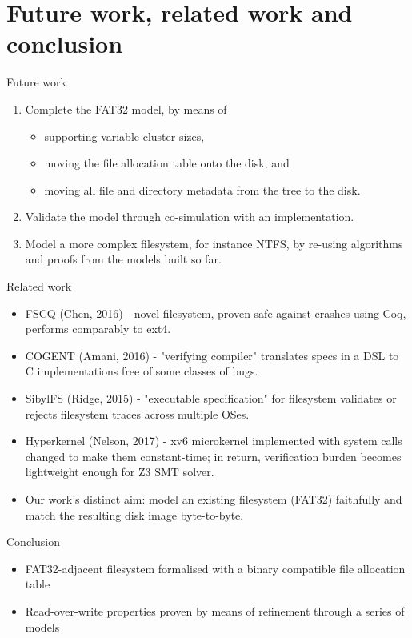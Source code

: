 \documentclass{beamer}
\begin{document}
\section{Future work, related work and conclusion}

\begin{frame}{Future work}
  \begin{enumerate}
  \item Complete the FAT32 model, by means of
    \begin{itemize}
    \item supporting variable cluster sizes,
    \item moving the file allocation table onto the disk, and
    \item moving all file and directory metadata from the tree to the
      disk.
    \end{itemize}
  \item Validate the model through co-simulation with an implementation.
  \item Model a more complex filesystem, for instance NTFS, by
    re-using algorithms and proofs from the models built so far.
  \end{enumerate}
\end{frame}

\begin{frame}{Related work}
  \begin{itemize}
  \item FSCQ (Chen, 2016) - novel filesystem, proven
    safe against crashes using Coq, performs comparably to
    ext4.
  \item COGENT (Amani, 2016) - "verifying compiler" translates specs
    in a DSL to C implementations free of some classes of bugs.
  \item SibylFS (Ridge, 2015) - "executable specification" for
    filesystem validates or rejects filesystem traces across multiple
    OSes.
  \item Hyperkernel (Nelson, 2017) - xv6 microkernel implemented
    with system calls changed to make them constant-time; in return,
    verification burden becomes lightweight enough for Z3 SMT solver.
  \item Our work's distinct aim: model an existing filesystem (FAT32)
    faithfully and match the resulting disk image byte-to-byte.
  \end{itemize}
\end{frame}

\begin{frame}{Conclusion}
  \begin{itemize}
  \item FAT32-adjacent filesystem formalised with
    a binary compatible file allocation table
  \item Read-over-write properties proven by means of refinement
    through a series of models
  \end{itemize}
\end{frame}
\end{document}
